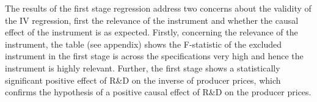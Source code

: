 \par   The results of the first stage regression address two concerns about the validity of the IV regression, first the relevance of the instrument and whether the causal effect of the instrument is as expected.
Firstly, concerning the relevance of the instrument, the table (see appendix) shows the F-statistic of the excluded instrument in the first stage is across the specifications very high and hence the instrument is highly relevant.
Further, the first stage shows a statistically significant positive effect of  R\&D on the inverse of producer prices, which confirms the hypothesis of a positive causal effect of R\&D on the producer prices.  %
